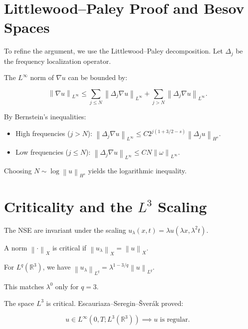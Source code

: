 \documentclass[11pt,a4paper]{amsart}
\newcommand{\norm}[1]{\left\|#1\right\|}
\newcommand{\R}{\mathbb{R}}
\begin{document}
\section{Littlewood--Paley Proof and Besov Spaces}



To refine the argument, we use the Littlewood--Paley decomposition. Let $\Delta_j$ be the frequency localization operator.

The $L^\infty$ norm of $\nabla u$ can be bounded by:

\begin{equation}

\norm{\nabla u}_{L^\infty} \le \sum_{j \le N} \norm{\Delta_j \nabla u}_{L^\infty} + \sum_{j > N} \norm{\Delta_j \nabla u}_{L^\infty}.

\end{equation}

By Bernstein's inequalities:

\begin{itemize}

    \item High frequencies ($j > N$): $\norm{\Delta_j \nabla u}_{L^\infty} \le C 2^{j(1 + 3/2 - s)} \norm{\Delta_j u}_{H^s}$.

    \item Low frequencies ($j \le N$): $\norm{\Delta_j \nabla u}_{L^\infty} \le C N \norm{\omega}_{L^\infty}$.

\end{itemize}

Choosing $N \sim \log \norm{u}_{H^s}$ yields the logarithmic inequality.



\section{Criticality and the $L^3$ Scaling}



The NSE are invariant under the scaling $u_\lambda(x,t) = \lambda u(\lambda x, \lambda^2 t)$.

A norm $\norm{\cdot}_X$ is critical if $\norm{u_\lambda}_X = \norm{u}_X$.

For $L^q(\R^3)$, we have $\norm{u_\lambda}_{L^q} = \lambda^{1 - 3/q} \norm{u}_{L^q}$.

This matches $\lambda^0$ only for $q=3$.

The space $L^3$ is critical. Escauriaza--Seregin--\v{S}ver\'ak proved:

\begin{equation}

u \in L^\infty(0, T; L^3(\R^3)) \implies u \text{ is regular}.

\end{equation}
\end{document}
